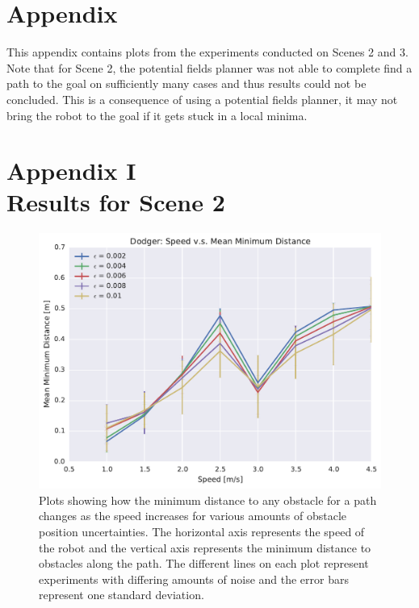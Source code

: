 


\chapter{Appendix}

\label{chapter:appendix}

This appendix contains plots from the experiments conducted on Scenes 2 and 3.
Note that for Scene 2, the potential fields planner was not able to complete
find a path to the goal on sufficiently many cases and thus results could not
be concluded. This is a consequence of using a potential fields planner, it may
not bring the robot to the goal if it gets stuck in a local minima.

\chapter*{Appendix I\\Results for Scene 2}

\begin{figure}[h!]
    \centering
    \includegraphics[width=0.80\linewidth]{figs/planner_mean_min_distance_1}

    \caption{Plots showing how the minimum distance to any obstacle for a path
        changes as the speed increases for various amounts of obstacle position
        uncertainties.  The horizontal axis represents the speed of the robot
        and the vertical axis represents the minimum distance to obstacles
        along the path. The different lines on each plot represent experiments
    with differing amounts of noise and the error bars represent one standard
deviation.}

\end{figure}

